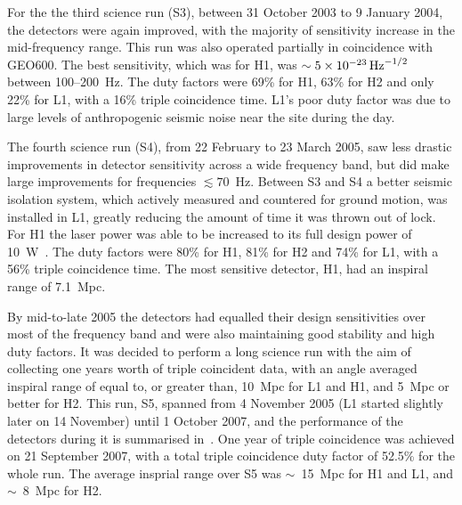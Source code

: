 \documentclass{article}
\begin{document}
For the the third science run (S3), between 31 October 2003 to 9 January 2004,
the detectors were again improved, with the majority of sensitivity increase in
the mid-frequency range. This run was also operated partially in coincidence
with GEO600. The best sensitivity, which was for H1, was
$\sim5\times10^{-23}\,{\rm Hz}^{-1/2}$ between 100--200~Hz. The duty factors
were 69\% for H1, 63\% for H2 and only 22\% for L1, with a 16\% triple
coincidence time. L1's poor duty factor was due to large levels of anthropogenic
seismic noise near the site during the day.

The fourth science run (S4), from 22 February to 23 March 2005, saw less drastic
improvements in detector sensitivity across a wide frequency band, but did make
large improvements for frequencies $\lesssim 70$~Hz. Between S3 and S4 a better
seismic isolation system, which actively measured and countered for ground
motion, was installed in L1, greatly reducing the amount of time it was thrown
out of lock. For H1 the laser power was able to be increased to its full design
power of 10~W~\cite{Abbott:2007b}. The duty factors were 80\% for H1, 81\% for
H2 and 74\% for L1, with a 56\% triple coincidence time. The most sensitive
detector, H1, had an inspiral range of 7.1~Mpc.

By mid-to-late 2005 the detectors had equalled their design sensitivities over
most of the frequency band and were also maintaining good stability and high
duty factors. It was decided to perform a long science run with the aim of
collecting one years worth of triple coincident data, with an angle averaged
inspiral range of equal to, or greater than, 10~Mpc for L1 and H1, and 5~Mpc
or better for H2. This run, S5, spanned from 4 November 2005 (L1 started
slightly later on 14 November) until 1 October 2007, and the performance of the
detectors during it is summarised in~\cite{LIGOS5}. One year of triple
coincidence was achieved on 21 September 2007, with a total triple coincidence
duty factor of 52.5\% for the whole run. The average insprial range over S5
was $\sim$~15~Mpc for H1 and L1, and $\sim$~8~Mpc for H2.
\end{document}
